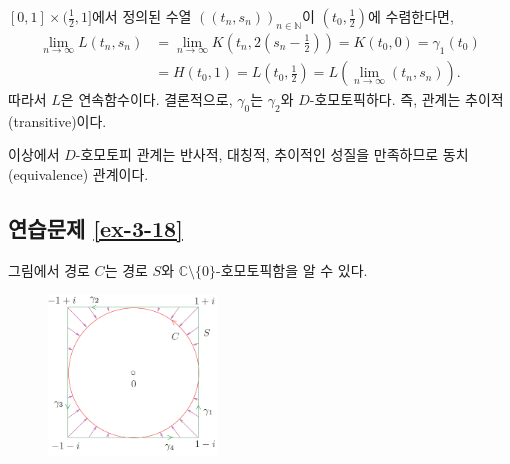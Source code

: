 $[0,1]\times (\frac12,1]$에서 정의된 수열 $((t_n, s_n))_{n\in\mathbb N}$이
$(t_0,\frac12)$에 수렴한다면,
\begin{align*}
\lim_{n\to\infty} L(t_n, s_n)
& = \lim_{n\to\infty} K\left( t_n, 2(s_n - \frac12)\right)
= K(t_0,0) = \gamma_1(t_0) \\
&= H(t_0,1) = L\left( t_0, \frac12\right) = L\left( \lim_{n\to\infty} (t_n, s_n) \right).
\end{align*}
따라서 $L$은 연속함수이다.
결론적으로, $\gamma_0$는 $\gamma_2$와 $D$-호모토픽하다.
즉, 관계는 추이적(transitive)이다.

이상에서 $D$-호모토피 관계는 반사적, 대칭적, 추이적인 성질을 만족하므로
동치(equivalence) 관계이다.

\subsection*{연습문제 \ref{ex-3-18}}

그림에서 경로 $C$는 경로 $S$와 $\mathbb C\setminus \{0\}$-호모토픽함을 알 수 있다.

\begin{figure}[h!]
\begin{center}
\includegraphics[width=0.4\textwidth]{./Solution/figs/fig-s-0-9}
\end{center}
\end{figure}

